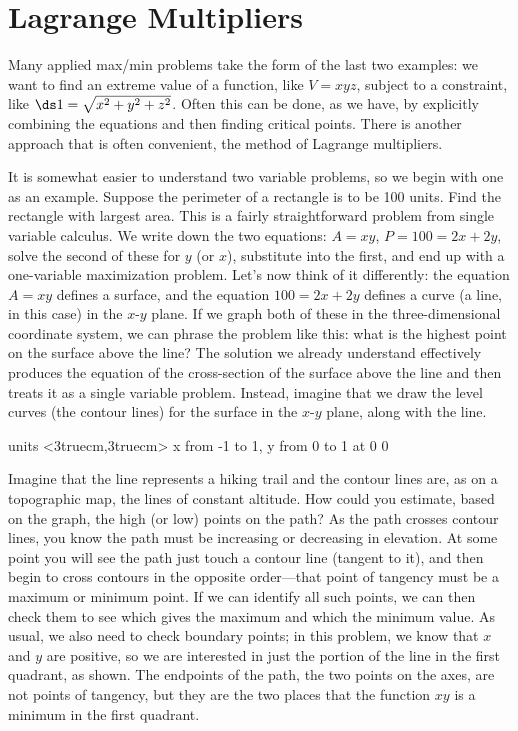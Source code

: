 \section{Lagrange Multipliers}{}{}

Many applied max/min problems take the form of the last two examples:
we want to find an extreme value of a function, like $V=xyz$, subject
to a constraint, like $\ds1=\sqrt{x^2+y^2+z^2}$. Often this can be
done, as we have, by explicitly combining the equations and then
finding critical points. There is another approach that is often
convenient, the method of {\dfont Lagrange multipliers}.

It is somewhat easier to understand two variable problems, so we begin
with one as an example. Suppose the perimeter of a rectangle is to be
100 units. Find the rectangle with largest area. This is a fairly
straightforward problem from single variable calculus. We write down
the two equations: $A=xy$, $P=100=2x+2y$, solve the second of these
for $y$ (or $x$), substitute into the first, and end up with a
one-variable maximization problem. Let's now think of it differently:
the equation $A=xy$ defines a surface, and the equation $100=2x+2y$
defines a curve (a line, in this case) in the $x$-$y$ plane. If we
graph both of these in the three-dimensional coordinate system, we can
phrase the problem like this: what is the highest point on the surface
above the line? The solution we already understand effectively
produces the equation of the cross-section of the surface above the
line and then treats it as a single variable problem. Instead, imagine
that we draw the level curves (the contour lines) for the surface in
the $x$-$y$ plane, along with the line.

\figure
\vbox{\beginpicture
\normalgraphs
\ninepoint
\setcoordinatesystem units <3truecm,3truecm>
\setplotarea x from -1 to 1, y from 0 to 1
 at 0 0
\endpicture}

Imagine that the line represents a hiking trail and the contour lines
are, as on a topographic map, the lines of constant altitude. How
could you estimate, based on the graph, the high (or low) points on
the path? As the path crosses contour lines, you know the path must be
increasing or decreasing in elevation. At some point you will see the
path just touch a contour line (tangent to it), and then begin to
cross contours in the opposite order---that point of tangency must be
a maximum or minimum point. If we can identify all such points, we can
then check them to see which gives the maximum and which the minimum
value. As usual, we also need to check boundary points; in this
problem, we know that $x$ and $y$ are positive, so we are interested
in just the portion of the line in the first quadrant, as shown. The
endpoints of the path, the two points on the axes, are not points of
tangency, but they are the two places that the function $xy$ is a
minimum in the first quadrant.

